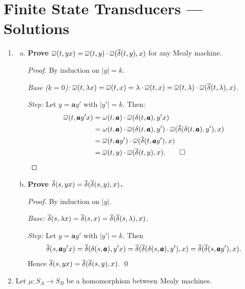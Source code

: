 
\chapter{Finite State Transducers --- Solutions}

\begin{enumerate}[{7.}1.]

\item \begin{enumerate}[(a)]
  \item \textbf{Prove $\overline{\omega}(t,yx)=\overline{\omega}(t,y)\cdot\overline{\omega}(\overline{\delta}(t,y),x)$} for any Mealy machine.

  \begin{proof}
  By induction on $|y|=k$.

  \emph{Base ($k=0$):} $\overline{\omega}(t,\lambda x)=\overline{\omega}(t,x)=\lambda\cdot\overline{\omega}(t,x)=\overline{\omega}(t,\lambda)\cdot\overline{\omega}(\overline{\delta}(t,\lambda),x)$.

  \emph{Step:}  Let $y=\pmb{a}y'$ with $|y'|=k$.  Then:
  \begin{align*}
    \overline{\omega}(t,\pmb{a}y'x)
    &= \omega(t,\pmb{a})\cdot\overline{\omega}(\delta(t,\pmb{a}),y'x) \\
    &= \omega(t,\pmb{a})\cdot\overline{\omega}(\delta(t,\pmb{a}),y')\cdot
       \overline{\omega}(\overline{\delta}(\delta(t,\pmb{a}),y'),x) \\
    &= \overline{\omega}(t,\pmb{a}y')\cdot\overline{\omega}(\overline{\delta}(t,\pmb{a}y'),x) \\
    &= \overline{\omega}(t,y)\cdot\overline{\omega}(\overline{\delta}(t,y),x). \qed
  \end{align*}
  \end{proof}

  \item \textbf{Prove $\overline{\delta}(s,yx)=\overline{\delta}(\overline{\delta}(s,y),x)$.}

  \begin{proof}
  By induction on $|y|$.

  \emph{Base:} $\overline{\delta}(s,\lambda x)=\overline{\delta}(s,x)=\overline{\delta}(\overline{\delta}(s,\lambda),x)$.

  \emph{Step:}  Let $y=\pmb{a}y'$ with $|y'|=k$.  Then
  \[
    \overline{\delta}(s,\pmb{a}y'x)=
    \overline{\delta}(\delta(s,\pmb{a}),y'x)=
    \overline{\delta}(\overline{\delta}(\delta(s,\pmb{a}),y'),x)=
    \overline{\delta}(\overline{\delta}(s,\pmb{a}y'),x).
  \]
  Hence $\overline{\delta}(s,yx)=\overline{\delta}(\overline{\delta}(s,y),x)$. \qed
  \end{proof}
\end{enumerate}

\item Let $\mu:S_A\to S_B$ be a homomorphism between Mealy machines.


\end{enumerate}
